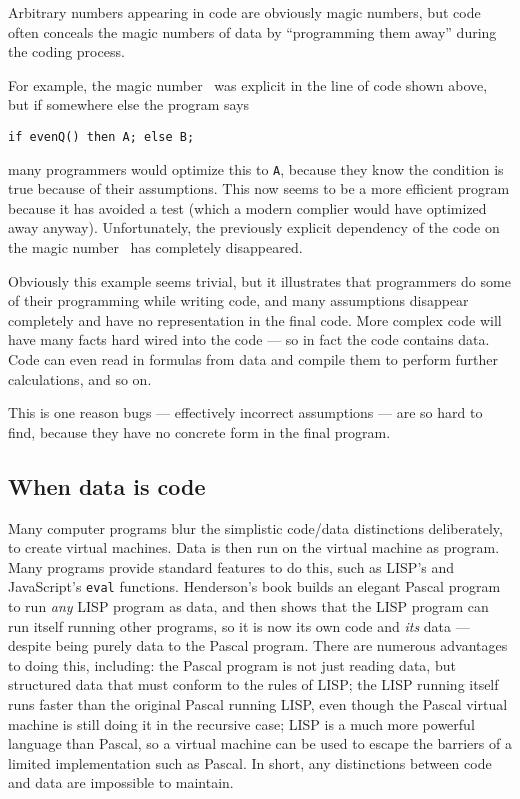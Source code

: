 \documentclass[10pt,a4paper]{article}
\begin{document}
Arbitrary numbers appearing in code are obviously magic numbers, but code often conceals the magic numbers of data by ``programming them away'' during the coding process. 

For example, the magic number \the\magicNumber\ was explicit in the line of code shown above, but if somewhere else the program says

\begin{center}\texttt{if evenQ(\the\magicNumber) then A; else B;}\end{center}

many programmers would optimize this to \texttt{A}, because they know the condition is true because of their assumptions. This now seems to be a more efficient program because it has avoided a test (which a modern complier would have optimized away anyway). Unfortunately, the previously explicit dependency of the code on the magic number \the\magicNumber\ has completely disappeared.

Obviously this example seems trivial, but it illustrates that programmers do some of their programming while writing code, and many assumptions disappear completely and have no representation in the final code. More complex code will have many facts hard wired into the code --- so in fact the code contains data. Code can even read in formulas from data and compile them to perform further calculations, and so on.  

This is one reason bugs --- effectively incorrect assumptions --- are so hard to find, because they have no concrete form in the final program.

\subsection{When data is code}
{Many computer programs blur the simplistic code/data distinctions deliberately, to create virtual machines. Data is then run on the virtual machine as program. Many programs provide standard features to do this, such as LISP's and JavaScript's \texttt{eval} functions. Henderson's book \cite{henderson} builds an elegant Pascal program to run \emph{any\/} LISP program as data, and then shows that the LISP program can run itself running other programs, so it is now its own code and \emph{its\/} data --- despite being purely data to the Pascal program. There are numerous advantages to doing this, including: the Pascal program is not just reading data, but structured data that must conform to the rules of LISP; the LISP running itself runs faster than the original Pascal running LISP, even though the Pascal virtual machine is still doing it in the recursive case; LISP is a much more powerful language than Pascal, so a virtual machine can be used to escape the barriers of a limited implementation such as Pascal. In short, any distinctions between code and data are impossible to maintain.}
\end{document}
